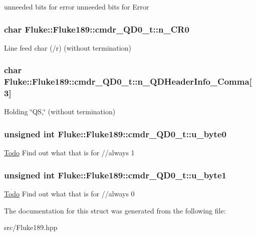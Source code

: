 unneeded bits for error unneeded bits for Error \hypertarget{structFluke_1_1Fluke189_1_1cmdr__QD0__t_a052cc7ae576b3634f2eb8e1a4587c29e}{
\subsubsection[{n\_\-CR0}]{\setlength{\rightskip}{0pt plus 5cm}char {\bf Fluke::Fluke189::cmdr\_\-QD0\_\-t::n\_\-CR0}}}
\label{structFluke_1_1Fluke189_1_1cmdr__QD0__t_a052cc7ae576b3634f2eb8e1a4587c29e}
Line feed char (/r) (without termination) \hypertarget{structFluke_1_1Fluke189_1_1cmdr__QD0__t_adbec2e8d0ea53d60baa33f2bad91e272}{
\subsubsection[{n\_\-QDHeaderInfo\_\-Comma}]{\setlength{\rightskip}{0pt plus 5cm}char {\bf Fluke::Fluke189::cmdr\_\-QD0\_\-t::n\_\-QDHeaderInfo\_\-Comma}\mbox{[}3\mbox{]}}}
\label{structFluke_1_1Fluke189_1_1cmdr__QD0__t_adbec2e8d0ea53d60baa33f2bad91e272}
Holding \char`\"{}QS,\char`\"{} (without termination) \hypertarget{structFluke_1_1Fluke189_1_1cmdr__QD0__t_a8255c6d6c66768208d4a020146369013}{
\subsubsection[{u\_\-byte0}]{\setlength{\rightskip}{0pt plus 5cm}unsigned {\bf int} {\bf Fluke::Fluke189::cmdr\_\-QD0\_\-t::u\_\-byte0}}}
\label{structFluke_1_1Fluke189_1_1cmdr__QD0__t_a8255c6d6c66768208d4a020146369013}
\begin{Desc}
\item[\hyperlink{todo__todo000016}{Todo}]Find out what that is for //always 1 \end{Desc}
\hypertarget{structFluke_1_1Fluke189_1_1cmdr__QD0__t_a835768e5aabd53d41e1e7a4d10fdde1f}{
\subsubsection[{u\_\-byte1}]{\setlength{\rightskip}{0pt plus 5cm}unsigned {\bf int} {\bf Fluke::Fluke189::cmdr\_\-QD0\_\-t::u\_\-byte1}}}
\label{structFluke_1_1Fluke189_1_1cmdr__QD0__t_a835768e5aabd53d41e1e7a4d10fdde1f}
\begin{Desc}
\item[\hyperlink{todo__todo000017}{Todo}]Find out what that is for //always 0 \end{Desc}


The documentation for this struct was generated from the following file:\begin{DoxyCompactItemize}
\item 
src/Fluke189.hpp\end{DoxyCompactItemize}

